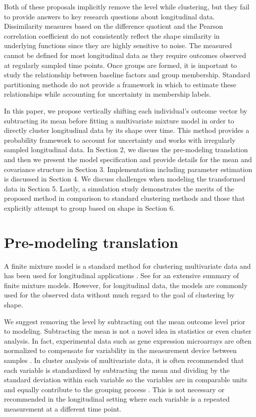 \documentclass[12pt]{article}
\begin{document}
Both of these proposals implicitly remove the level while clustering, but they fail to provide answers to key research questions about longitudinal data. Dissimilarity measures based on the difference quotient and the Pearson correlation coefficient do not consistently reflect the shape similarity in underlying functions since they are highly sensitive to noise. The measured cannot be defined for most longitudinal data as they require outcomes observed at regularly sampled time points. Once groups are formed, it is important to study the relationship between baseline factors and group membership. Standard partitioning methods do not provide a framework in which to estimate these relationships while accounting for uncertainty in membership labels.  

In this paper, we propose vertically shifting each individual's outcome vector by subtracting its mean before fitting a multivariate mixture model in order to directly cluster longitudinal data by its shape over time. This method provides a probability framework to account for uncertainty and works with irregularly sampled longitudinal data. In Section 2, we discuss the pre-modeling translation and then we present the model specification and provide details for the mean and covariance structure in Section 3. Implementation including parameter estimation is discussed in Section 4. We discuss challenges when modeling the transformed data in Section 5. Lastly, a simulation study demonstrates the merits of the proposed method in comparison to standard clustering methods and those that explicitly attempt to group based on shape in Section 6.

\section{Pre-modeling translation}
A finite mixture model is a standard method for clustering multivariate data \cite{everitt2009} and has been used for longitudinal applications \cite{muthen2010, jones2001}. See \cite{mclachlan2000} for an extensive summary of finite mixture models. However, for longitudinal data, the models are commonly used for the observed data without much regard to the goal of clustering by shape. 

We suggest removing the level by subtracting out the mean outcome level prior to modeling. Subtracting the mean is not a novel idea in statistics or even cluster analysis. In fact, experimental data such as gene expression microarrays are often normalized to compensate for variability in the measurement device between samples \cite{park2003}. In cluster analysis of multivariate data, it is often recommended that each variable is standardized by subtracting the mean and dividing by the standard deviation within each variable so the variables are in comparable units and equally contribute to the grouping process \cite{everitt2009}. This is not necessary or recommended in the longitudinal setting where each variable is a repeated measurement at a different time point. 
\end{document}
